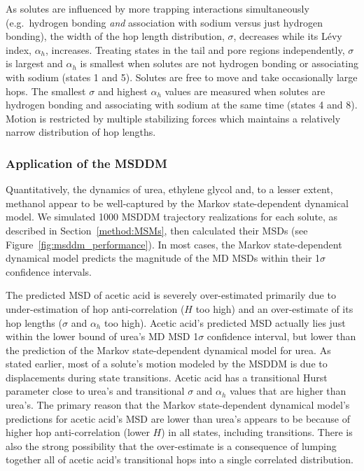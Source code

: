 \documentclass[journal=jctcce,manuscript=article]{achemso}
\begin{document}
  As solutes are influenced by more trapping interactions simultaneously
  (e.g.~hydrogen bonding \textit{and} association with sodium versus just
  hydrogen bonding), the width of the hop length distribution, $\sigma$,
  decreases while its L\'evy index, $\alpha_h$, increases. Treating states in
  the tail and pore regions independently, $\sigma$ is largest and $\alpha_h$
  is smallest when solutes are not hydrogen bonding or associating with sodium
  (states 1 and 5). Solutes are free to move and take occasionally large hops.
  The smallest $\sigma$ and highest $\alpha_h$ values are measured when solutes
  are hydrogen bonding and associating with sodium at the same time (states 4
  and 8). Motion is restricted by multiple stabilizing forces which maintains a
  relatively narrow distribution of hop lengths.
  
  \subsubsection{Application of the MSDDM}\label{section:msddm_application}
  
  Quantitatively, the dynamics of urea, ethylene glycol and, to a lesser extent, 
  methanol appear to be well-captured by the Markov state-dependent dynamical 
  model. We simulated 1000 MSDDM trajectory realizations for each solute, as 
  described in Section~\ref{method:MSMs}, then calculated their MSDs (see 
  Figure~\ref{fig:msddm_performance}). In most cases, the Markov state-dependent
  dynamical model predicts the magnitude of the MD MSDs within their 1$\sigma$ 
  confidence intervals. 
 
  The predicted MSD of acetic acid is severely over-estimated primarily due to
  under-estimation of hop anti-correlation ($H$ too high) and an over-estimate
  of its hop lengths ($\sigma$ and $\alpha_h$ too high). Acetic acid's
  predicted MSD actually lies just within the lower bound of urea's MD MSD
  1$\sigma$ confidence interval, but lower than the prediction of the Markov 
  state-dependent dynamical model for urea. As stated earlier, most of a solute’s
  motion modeled by the MSDDM is due to displacements during state transitions.
  Acetic acid has a transitional Hurst parameter close to urea’s and transitional
  $\sigma$ and $\alpha_h$ values that are higher than urea’s. The primary reason 
  that the Markov state-dependent dynamical model's predictions for acetic acid's
  MSD are lower than urea's appears to be because of higher hop anti-correlation
  (lower $H$) in all states, including transitions. There is also the strong 
  possibility that the over-estimate is a consequence of lumping together all of
  acetic acid’s transitional hops into a single correlated distribution.
\end{document}

